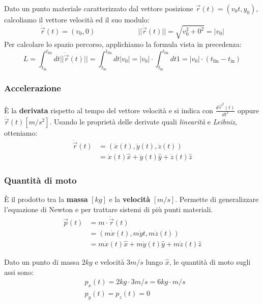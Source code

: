 \begin{example}
	Dato un punto materiale caratterizzato dal vettore posizione $\vec{r}(t) = (v_0t,y_0)$, calcoliamo il vettore velocità ed il suo modulo:
	\begin{equation*}
		\dot{\vec{r}}(t) = (v_0,0) \qquad\qquad\qquad \lvert\lvert \dot{\vec{r}}(t)\rvert\rvert = \sqrt{v_0^2 + 0^2} = \lvert v_0\rvert
	\end{equation*}
	Per calcolare lo spazio percorso, applichiamo la formula vista in precedenza:
	\begin{equation*}
		L = \int_{t_\text{in}}^{t_\text{fin}} dt \lvert\lvert \dot{\vec{r}} (t) \rvert\rvert = \int_{t_\text{in}}^{t_\text{fin}} dt \lvert v_0 \rvert = \lvert v_0 \rvert \cdot \int_{t_\text{in}}^{t_\text{fin}} dt1 = \lvert v_0 \rvert \cdot (t_\text{fin} - t_\text{in})
	\end{equation*}
\end{example}

\subsubsection{Accelerazione}
È la \textbf{derivata} rispetto al tempo del vettore velocità e si indica con $\frac{d \vec{r}^2(t)}{dt^2}$ oppure $\ddot{\vec{r}}(t)[m/s^2]$. Usando le proprietà delle derivate quali \textit{linearità} e \textit{Leibniz}, otteniamo:
\begin{equation}
	\begin{split}
		\ddot{\vec{r}}(t) & = (\ddot{x}(t), \ddot{y}(t), \ddot{z}(t)) \\
		& = \ddot{x} (t) \widehat{x} + \ddot{y}(t) \widehat{y} + \ddot{z}(t) \widehat{z}
	\end{split}
\end{equation}

\subsubsection{Quantità di moto}
È il prodotto tra la \textbf{massa} $[kg]$ e la \textbf{velocità} $[m/s]$. Permette di generalizzare l'equazione di Newton e per trattare sistemi di più punti materiali.
\begin{equation}
	\begin{split}
		\vec{p}(t) & = m \cdot \dot{\vec{r}}(t) \\
		& = (m \dot{x}(t), m \dot{y}t, m\dot{z}(t)) \\
		& = m\dot{x}(t)\widehat{x} + m\dot{y}(t)\widehat{y} + m\dot{z}(t)\widehat{z}
	\end{split}
\end{equation}
\begin{example}
	Dato un punto di massa $2kg$ e velocità $3m/s$ lungo $\widehat{x}$, le quantità di moto sugli assi sono:
	\begin{equation*}
		\begin{split}
			& p_x(t) = 2 kg \cdot 3 m/s = 6 kg \cdot m/s \\
			& p_y(t) = p_z(t) = 0
		\end{split}
	\end{equation*}
\end{example}

